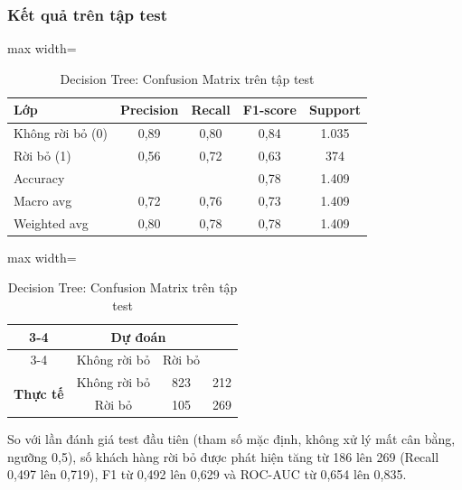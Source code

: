\subsubsection{Kết quả trên tập test}
\begin{table}[H]
\centering
\begin{minipage}[t]{0.56\textwidth}
\centering
\small
\begin{adjustbox}{max width=\textwidth}
\begin{tabular}{|l|c|c|c|c|}
\hline
\textbf{Lớp} & \textbf{Precision} & \textbf{Recall} & \textbf{F1-score} & \textbf{Support} \\
\hline
Không rời bỏ (0) & 0,89 & 0,80 & 0,84 & 1.035 \\
\hline
Rời bỏ (1) & 0,56 & 0,72 & 0,63 & 374 \\
\hline
Accuracy & & & 0,78 & 1.409 \\
\hline
Macro avg & 0,72 & 0,76 & 0,73 & 1.409 \\
\hline
Weighted avg & 0,80 & 0,78 & 0,78 & 1.409 \\
\hline
\end{tabular}
\end{adjustbox}
\caption{Decision Tree: kết quả phân loại trên tập test (ngưỡng 0,60; ROC-AUC 0,835; PR-AUC 0,624)}
\end{minipage}\hfill
\begin{minipage}[t]{0.42\textwidth}
\centering
\small
\begin{adjustbox}{max width=\textwidth}
\begin{tabular}{|c|c|c|c|}
\cline{3-4}
\multicolumn{2}{c|}{} & \multicolumn{2}{c|}{\textbf{Dự đoán}} \\
\cline{3-4}
\multicolumn{2}{c|}{} & Không rời bỏ & Rời bỏ \\
\hline
\multirow{2}{*}{\textbf{Thực tế}} & Không rời bỏ & \cellcolor{blue!30}823 & 212 \\
\cline{2-4}
 & Rời bỏ & 105 & \cellcolor{blue!30}269 \\
\hline
\end{tabular}
\end{adjustbox}
\caption{Decision Tree: Confusion Matrix trên tập test}
\end{minipage}
\end{table}

So với lần đánh giá test đầu tiên (tham số mặc định, không xử lý mất cân bằng, ngưỡng 0,5), số khách hàng rời bỏ được phát hiện tăng từ 186 lên 269 (Recall 0,497 lên 0,719), F1 từ 0,492 lên 0,629 và ROC-AUC từ 0,654 lên 0,835.

